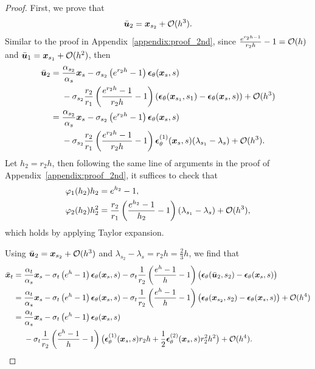 \begin{proof}
First, we prove that
\begin{equation}
    \bar {\bm{u}}_2 = \bm{x}_{s_2} + \mathcal O(h^3).
\end{equation}
Similar to the proof in Appendix~\ref{appendix:proof_2nd}, since $\frac{e^{r_2h - 1}}{r_2h} - 1 = \mathcal O(h)$ and $\bar {\bm{u}}_1 =\bm{x}_{s_1} + \mathcal O(h^2)$, then
\[ \begin{aligned}
\bar \uv_2
&= \frac{\alpha_{s_2}}{\alpha_s} \x_s - \sigma_{s_2} \left ( e^{r_2h} - 1 \right ) \epsilonv_\theta(\x_s, s)
\\
&\phantom{{}={}} - \sigma_{s_2} \frac{r_2}{r_1} \left (\frac{e^{r_2h} - 1}{r_2h} - 1 \right ) \left ( \epsilonv_\theta(\x_{s_1}, s_1) - \epsilonv_\theta(\x_s, s) \right ) + \Oc(h^3) \\
&= \frac{\alpha_{s_2}}{\alpha_s} \x_s - \sigma_{s_2} \left ( e^{r_2h} - 1 \right ) \epsilonv_\theta(\x_s, s)
\\ 
& \phantom{{}={}} - \sigma_{s_2} \frac{r_2}{r_1} \left (\frac{e^{r_2h} - 1}{r_2h} - 1 \right ) \epsilonv^{(1)}_\theta(\x_{s}, s) (\lambda_{s_1} - \lambda_s) + \Oc(h^3).
\end{aligned} \]
Let $h_2 = r_2h$, then following the same line of arguments in the proof of Appendix~\ref{appendix:proof_2nd}, it suffices to check that 
\[
\begin{aligned}
   \varphi_1(h_2) h_2 &= e^{h_2} - 1, \\
   \varphi_2(h_2) h_2^2 &= 
  \frac{r_2}{r_1} \left (\frac{e^{h_2} - 1}{h_2} - 1 \right ) (\lambda_{s_1} - \lambda_s) + \mathcal O(h^3), \\
\end{aligned}
\]
which holds by applying Taylor expansion.

Using $\bar {\bm{u}}_2 = \bm{x}_{s_2} + \mathcal O(h^3)$ and $\lambda_{s_2} - \lambda_s = r_2h = \frac{2}{3}h$, we find that
\[ \begin{aligned}
    \bar\x_{t} 
    &= \frac{\alpha_{t}}{\alpha_s} \x_s
        - \sigma_{t}\left(e^h - 1\right)\epsilonv_\theta(\x_s,s)
        - \sigma_{t}\frac{1}{r_2}\left( \frac{e^{h} - 1}{h} - 1\right)
          \big(\epsilonv_\theta(\bar\uv_2,s_2) - \epsilonv_\theta(\x_{s},s)\big) \\
    &= \frac{\alpha_{t}}{\alpha_s} \x_s
        - \sigma_{t}\left(e^h - 1\right)\epsilonv_\theta(\x_s,s)
        - \sigma_{t}\frac{1}{r_2}\left( \frac{e^{h} - 1}{h} - 1\right)
          \big(\epsilonv_\theta(\x_{s_2},s_2) - \epsilonv_\theta(\x_{s},s)\big) + \Oc(h^4) \\
    &= \frac{\alpha_{t}}{\alpha_s} \x_s
        - \sigma_{t}\left(e^h - 1\right)\epsilonv_\theta(\x_s,s)
   \\
   &\phantom{{}={}} - \sigma_{t}\frac{1}{r_2}\left( \frac{e^{h} - 1}{h} - 1\right)
          \big(\epsilonv^{(1)}_\theta(\x_{s},s) r_2h + \frac{1}{2}\epsilonv^{(2)}_\theta(\x_{s},s) r_2^2h^2 \big) + \Oc(h^4).
  \end{aligned} \]


\end{proof}
